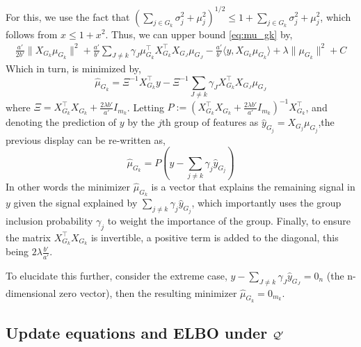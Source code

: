 For this, we use the fact that $ \left( \sum_{j \in G_k} \sigma_j^2 + \mu_j^2 \right)^{1/2} \leq 1 + \sum_{j \in G_k} \sigma_j^2 + \mu_j^2 $, which follows from $x \leq 1 + x^2$. Thus, we can upper bound \eqref{eq:mu_gk} by,
\begin{equation*}
\begin{aligned}
    \frac{a'}{2b'} 
    \| X_{G_k} \mu_{G_k} \|^2
+
    \frac{a'}{b'} 
    \sum_{J \neq k} 
	\gamma_J \mu_{G_k}^\top X_{G_k}^\top X_{G_J} \mu_{G_J} 
-
    \frac{a'}{b'}
    \langle y, X_{G_k} \mu_{G_k} \rangle
+
    \lambda \| \mu_{G_k} \|^2 + C
\end{aligned}
\end{equation*}
Which in turn, is minimized by,
\begin{equation*}
    \hat{\mu}_{G_k} = \Xi^{-1} X_{G_k}^\top y - \Xi^{-1} \sum_{J \neq k} \gamma_J X_{G_k}^\top X_{G_J} \mu_{G_J}    
\end{equation*}
where $\Xi = X_{G_k}^\top X_{G_k} + \frac{2 \lambda b'}{a'} I_{m_k}$. Letting $P := (X_{G_k}^\top X_{G_k} + \frac{2 \lambda b'}{a'} I_{m_k})^{-1} X_{G_k}^\top $, and denoting the prediction of $y$ by the $j$th group of features as $\hat{y}_{G_j} = X_{G_j} \mu_{G_j}$,the previous display can be re-written as,
\begin{equation*}
\hat{\mu}_{G_k} = P(y - \sum_{j \neq k} \gamma_j \hat{y}_{G_j})
\end{equation*}
In other words the minimizer $\hat{\mu}_{G_k}$ is a vector that explains the remaining signal in $y$ given the signal explained by $\sum_{j \neq k} \gamma_j \hat{y}_{G_j}$, which importantly uses the group inclusion probability $\gamma_j$ to weight the importance of the group. Finally, to ensure the matrix $X_{G_k}^\top X_{G_k}$ is invertible, a positive term is added to the diagonal, this being $2 \lambda \frac{b'}{a'}$.

To elucidate this further, consider the extreme case, $y - \sum_{J \neq k} \gamma_J \hat{y}_{G_J} = 0_n$ (the n-dimensional zero vector), then the resulting minimizer $\hat{\mu}_{G_k} = 0_{m_k}$.



\subsection{Update equations and ELBO under $\mathcal{Q}'$} \label{sec:alg_qp} 


